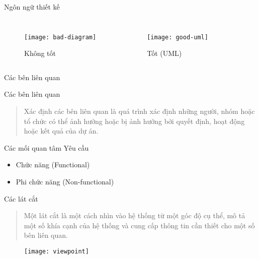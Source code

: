 \documentclass{beamer}
\begin{document}
\begin{frame}{Ngôn ngữ thiết kế}
    \begin{columns}
        \begin{figure}
            \centering
            \texttt{[image: bad-diagram]}
            \caption{Không tốt}
        \end{figure}
        \begin{figure}
            \centering
            \texttt{[image: good-uml]}
            \caption{Tốt (UML)}
        \end{figure}
    \end{columns}
\end{frame}

\begin{frame}{Các bên liên quan}
    \begin{block}{Các bên liên quan}
        \begin{quote}
            Xác định các bên liên quan là quá trình
            xác định những người, nhóm hoặc tổ chức
            có thể ảnh hưởng hoặc bị ảnh hưởng bởi
            quyết định, hoạt động hoặc kết quả của dự án.
        \end{quote}
    \end{block}
\end{frame}

\begin{frame}{Các mối quan tâm}
    Yêu cầu
    \begin{itemize}
        \item Chức năng (Functional)
        \item Phi chức năng (Non-functional)
    \end{itemize}
\end{frame}

\begin{frame}{Các lát cắt}
    \begin{block}{}
        \begin{quote}
            Một lát cắt là một cách nhìn vào hệ thống
            từ một góc độ cụ thể, mô tả một số khía cạnh
            của hệ thống và cung cấp thông tin cần thiết
            cho một số bên liên quan.
        \end{quote}
    \end{block}
    \begin{figure}
        \centering
        \texttt{[image: viewpoint]}
    \end{figure}
\end{frame}
\end{document}
